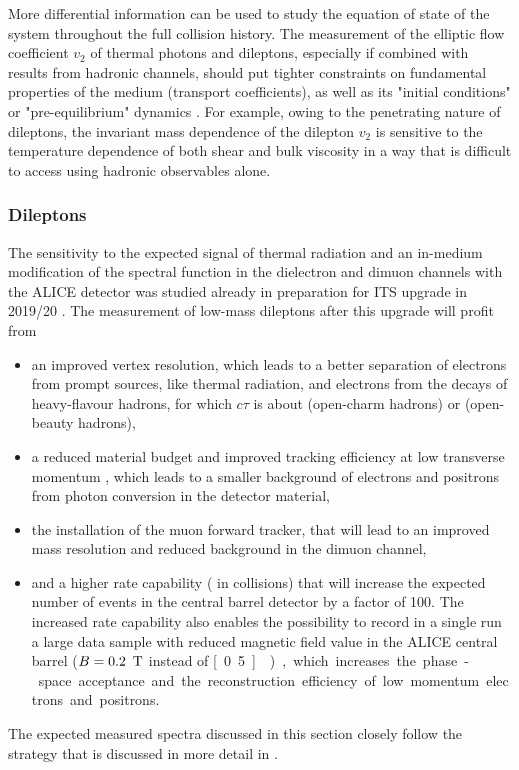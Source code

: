 \documentclass[../report.tex]{subfiles}
\begin{document}
More differential information can be used to study the equation of state of the system throughout the full collision history. The measurement of the elliptic flow coefficient $v_2$ of thermal photons and dileptons, especially if combined with results from hadronic channels, should put tighter constraints on fundamental properties of the medium (\eg transport coefficients), as well as its "initial conditions" or "pre-equilibrium" dynamics \cite{Vujanovic:2016anq}. For example, owing to the penetrating nature of dileptons, the invariant mass dependence of the dilepton $v_2$ is sensitive to the temperature dependence of both shear \cite{Vujanovic:2017psb} and bulk viscosity \cite{Vujanovic:2017wtw} in a way that is difficult to access using hadronic observables alone.




\subsubsection{Dileptons}
\label{sec:thermalradiation:dileptons}

The sensitivity to the expected signal of thermal radiation and an in-medium modification of the \PGr spectral function in the dielectron and dimuon channels with the ALICE detector \cite{Aamodt:2008zz,Abelev:2014ffa} was studied already in preparation for ITS upgrade in 2019/20 \cite{Abelevetal:2014cna,Abelevetal:2014dna,ALICE:2014qrd,ALICE:MFTLoI}. The measurement of low-mass dileptons after this upgrade will profit from  
\begin{itemize}
\item an improved vertex resolution, which leads to a better separation of electrons from prompt sources, like thermal radiation, and electrons from the decays of heavy-flavour hadrons, for which $c\tau$ is about \unit[150]{\Uum} (open-charm hadrons) or \unit[400]{\Uum} (open-beauty hadrons), 
\item a reduced material budget and improved tracking efficiency at low transverse momentum \pT, which leads to a smaller background of electrons and positrons from photon conversion in the detector material,
\item the installation of the muon forward tracker, that will lead to an improved mass resolution and reduced background in the dimuon channel,
\item and a higher rate capability (\unit[50]{\UkHz} in \PbPb{} collisions) that will increase the expected number of events in the central barrel detector by a factor of 100. The increased rate capability also enables the possibility to record in a single \PbPb{} run a large data sample with reduced magnetic field value in the ALICE central barrel ($B=\unit[0.2]{\UT}$ instead of \unit[0.5]{\UT}), which increases the phase-space acceptance and the reconstruction efficiency of low momentum electrons and positrons.
\end{itemize}
The expected measured spectra discussed in this section closely follow the strategy that is discussed in more detail in \cite{Abelevetal:2014cna,Abelevetal:2014dna,ALICE:2014qrd,ALICE:MFTLoI}.
\end{document}
